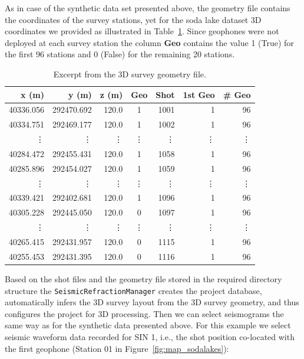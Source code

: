 \documentclass[a4paper,fleqn]{cas-sc}
\begin{document}
As in case of the synthetic data set presented above, the geometry file contains the coordinates of the survey stations, yet for the soda lake dataset 3D coordinates we provided as illustrated in Table~\ref{tab:3d_geometry}. 
Since geophones were not deployed at each survey station the column \textbf{Geo} contains the value 1 (True) for the first 96 stations and 0 (False) for the remaining \num{20} stations. 
\begin{table}
   \caption{Excerpt from the 3D survey geometry file.}
    \centering
    \begin{tabular}{rrrcrrr}
        \toprule
        \textbf{x (m)} & \textbf{y (m)} & \textbf{z (m)} & \textbf{Geo} & \textbf{Shot} & \textbf{1st Geo} & \textbf{\# Geo} \\
        \midrule
        40336.056 & 292470.692 & 120.0 & 1 & 1001	 & 1 & 96 \\
        40334.751 & 292469.177 & 120.0 & 1 & 1002 & 	1 & 96 \\
        \vdots & \vdots & \vdots & \vdots & \vdots & \vdots & \vdots \\
		40284.472 & 292455.431 & 120.0 & 1 & 1058 & 1 & 96 \\
		40285.896 & 292454.027 & 120.0 & 1 & 1059 & 1 & 96 \\
        \vdots & \vdots & \vdots & \vdots & \vdots & \vdots & \vdots \\
        40339.421 & 292402.681 & 120.0 & 1 & 1096 & 1 & 96 \\
		40305.228 & 292445.050 & 120.0 & 0 & 1097 & 1 & 96 \\
        \vdots & \vdots & \vdots & \vdots & \vdots & \vdots & \vdots \\
        40265.415 & 292431.957 & 120.0 & 0 & 1115 & 1 & 96 \\
		40255.453 & 292431.395 & 120.0 & 0 & 1116 & 1 & 96 \\
        \bottomrule
    \end{tabular}
    \label{tab:3d_geometry}
\end{table}
Based on the shot files and the geometry file stored in the required directory structure the \texttt{SeismicRefractionManager} creates the project database, automatically infers the 3D survey layout from the 3D survey geometry, and thus configures the project for 3D processing. Then we can select seismograms the same way as for the synthetic data presented above. For this example we select seismic waveform data recorded for SIN 1, i.e., the shot position co-located with the first geophone (Station 01 in Figure~\ref{fig:map_sodalakes}):
\end{document}
